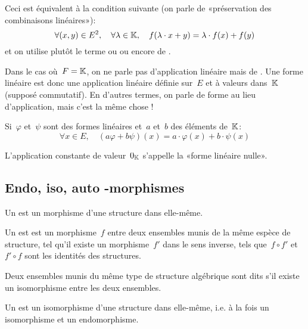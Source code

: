 Ceci est équivalent à la condition suivante (on parle de «préservation des combinaisons
linéaires»):
\begin{equation}\colorred
\forall (x,y)\in E^2,\quad \forall \lambda\in\KK,\quad f(\lambda\cdot x+ y)=\lambda \cdot f(x) + f(y)
\end{equation}
et on utilise plutôt le terme  ou  ou encore de .

\medskip
Dans le cas où~$F=\mathbb K$, on ne parle pas d'application linéaire mais de .
Une forme linéaire est donc une application linéaire définie sur~$E$ et à valeurs dans~$\mathbb K$ (supposé commutatif).
En d'autres termes, on parle de forme au lieu d'application, mais c'est la même chose !

\medskip
Si~$\varphi$ et~$\psi$ sont des formes linéaires et~$a$ et~$b$ des éléments de~$\mathbb K$:
\begin{equation}
  \forall x \in E,\quad (a\varphi + b\psi)(x) = a\cdot \varphi(x) + b\cdot \psi(x)
\end{equation}

\medskip
L'application constante de valeur~$0_{\mathbb K}$ s'appelle la «forme linéaire nulle».

\medskip
\subsection{Endo, iso, auto -morphismes}

Un  est un morphisme d'une structure dans elle-même.

\medskip
Un  est est un morphisme~$f$ entre deux ensembles munis de la même espèce de structure, tel qu'il existe un morphisme~$f'$ dans le sens inverse, tels que~$f\circ f'$ et~$f'\circ f$ sont les identités des structures.

Deux ensembles munis du même type de structure algébrique sont dits  s'il existe un isomorphisme entre les deux ensembles.


\medskip
Un  est un isomorphisme d'une structure dans elle-même, i.e. à la fois un isomorphisme et un endomorphisme.

